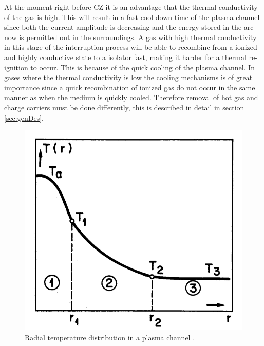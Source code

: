 \documentclass[10pt,a4paper]{article} %
\begin{document}
At the moment right before CZ it is an advantage that the thermal conductivity of the gas is high. This will result in a fast cool-down time of the plasma channel since both the current amplitude is decreasing and the energy stored in the arc now is permitted out in the surroundings. A gas with high thermal conductivity in this stage of the interruption process will be able to recombine from a ionized and highly conductive state to a isolator fast, making it harder for a thermal re-ignition to occur. This is because of the quick cooling of the plasma channel. In gases where the thermal conductivity is low the cooling mechanisms is of great importance since a quick recombination of ionized gas do not occur in the same manner as when the medium is quickly cooled. Therefore removal of hot gas and charge carriers must be done differently, this is described in detail in section \ref{sec:genDes}.

\begin{figure}[H]
\centering
\includegraphics[scale=0.3]{Bilder/Theory/tempZonesArc.png}
\caption{Radial temperature distribution in a plasma channel \cite{bib:TDCIGBB}.} \label{fig:tempDist1}
\end{figure}
\end{document}
